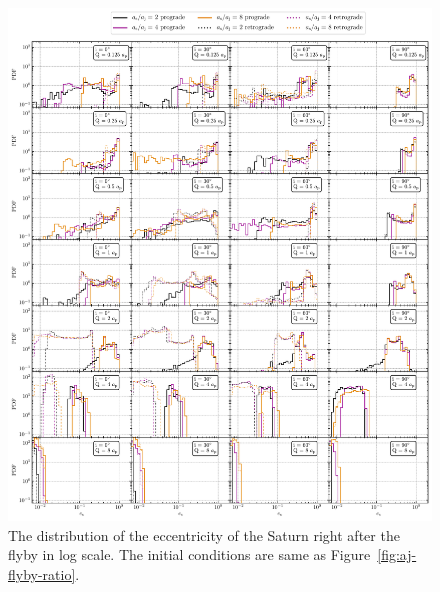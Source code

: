 \documentclass[twocolumn]{aastex63}
\newcommand*\fgr[1]{Figure~\ref{#1}}
\begin{document}
\begin{figure}
    \includegraphics[width=\textwidth]{figs/es-flyby-ratio.pdf}
    \caption{The distribution of the eccentricity of the Saturn right after the flyby in log scale. The initial conditions are same as \fgr{fig:aj-flyby-ratio}.} 
    \label{fig:es-flyby-ratio}
\end{figure}
\end{document}
